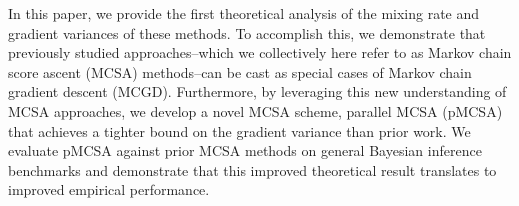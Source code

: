 
In this paper, we provide the first theoretical analysis of the mixing rate and gradient variances of these methods.
To accomplish this, we demonstrate that previously studied approaches--which we collectively here refer to as Markov chain score ascent (MCSA) methods--can be cast as special cases of Markov chain gradient descent (MCGD).
Furthermore, by leveraging this new understanding of MCSA approaches, we develop a novel MCSA scheme, parallel MCSA (pMCSA) that achieves a tighter bound on the gradient variance than prior work.
We evaluate pMCSA against prior MCSA methods on general Bayesian inference benchmarks and demonstrate that this improved theoretical result translates to improved empirical performance.



